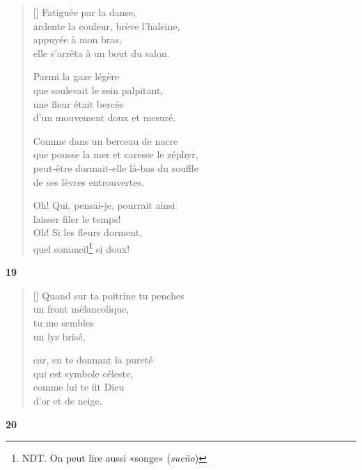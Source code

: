 \documentclass[a4paper,12pt]{book}
\begin{document}
\settowidth{\versewidth}{que pousse la mer et caresse le zéphir,}

\begin{verse}[\versewidth]
  Fatiguée par la danse, \\
  ardente la couleur, brève l'haleine, \\
  appuyée à mon bras, \\
  elle s'arrêta à un bout du salon.

  Parmi la gaze légère \\
  que soulevait le sein palpitant, \\
  une fleur était bercée \\
  d'un mouvement doux et mesuré.

  Comme dans un berceau de nacre \\
  que pousse la mer et caresse le zéphyr, \\
  peut-être dormait-elle là-bas du souffle \\
  de ses lèvres entrouvertes.

  Oh! Qui, pensai-je, pourrait ainsi \\
  laisser filer le temps! \\
  Oh! Si les fleurs dorment, \\
  quel sommeil\footnote{NDT. On peut lire aussi «songe» (\emph{sueño})} si doux!
\end{verse}

\bigskip

\begin{center}
  \textbf{19}
\end{center}

\settowidth{\versewidth}{Quand sur ta poitrine tu penches}

\begin{verse}[\versewidth]
  Quand sur ta poitrine tu penches \\
  un front mélancolique, \\
  tu me sembles \\
  un lys brisé,

  car, en te donnant la pureté \\
  qui est symbole céleste, \\
  comme lui te fit Dieu \\
  d'or et de neige.
\end{verse}

\bigskip

\begin{center}
  \textbf{20}
\end{center}
\end{document}
